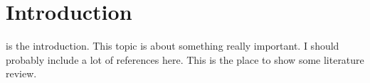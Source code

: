 \section{Introduction}
\label{sec:intro}

 is the introduction. This topic is about something really important. I should probably include a lot of references here. This is the place to show some literature review.

